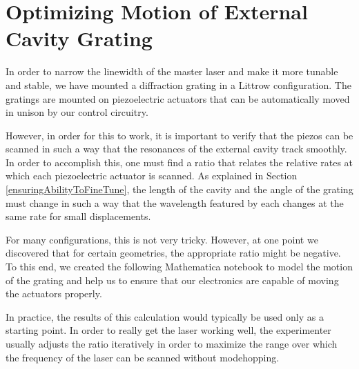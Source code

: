 \chapter{Optimizing Motion of External Cavity Grating}\label{GratingRatioAppendix}
In order to narrow the linewidth of the master laser and make it more tunable and stable, we have mounted a diffraction grating in a Littrow configuration. The gratings are mounted on piezoelectric actuators that can be automatically moved in unison by our control circuitry. 

However, in order for this to work, it is important to verify that the piezos can be scanned in such a way that the resonances of the external cavity track smoothly. In order to accomplish this, one must find a ratio that relates the relative rates at which each piezoelectric actuator is scanned. As explained in Section \ref{ensuringAbilityToFineTune}, the length of the cavity and the angle of the grating must change in such a way that the wavelength featured by each changes at the same rate for small displacements. 

For many configurations, this is not very tricky. However, at one point we discovered that for certain geometries, the appropriate ratio might be negative. To this end, we created the following Mathematica notebook to model the motion of the grating and help us to ensure that our electronics are capable of moving the actuators properly. 

In practice, the results of this calculation would typically be used only as a starting point. In order to really get the laser working well, the experimenter usually adjusts the ratio iteratively in order to maximize the range over which the frequency of the laser can be scanned without modehopping. 




